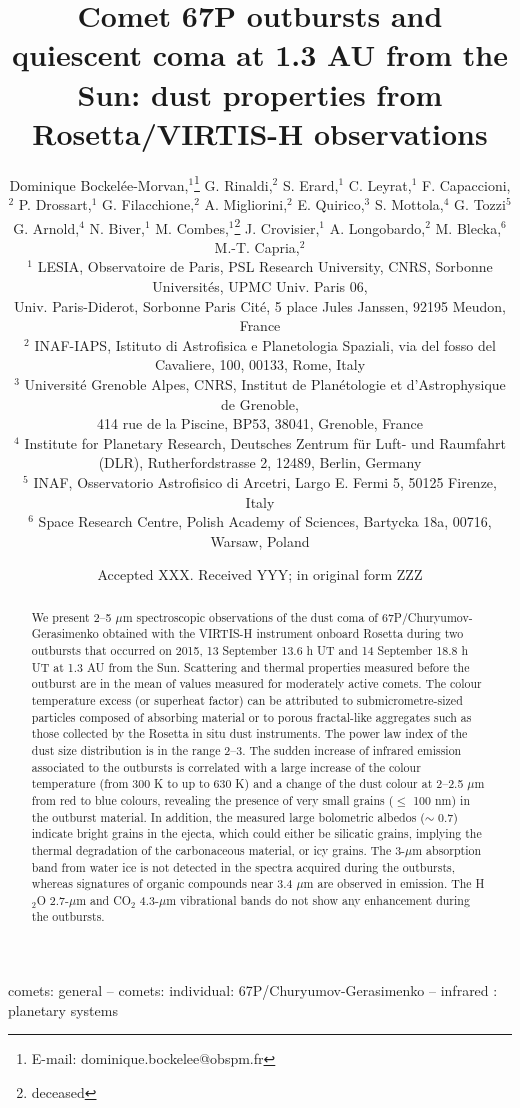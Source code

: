\documentclass[a4paper,fleqn,usenatbib]{mnras}
\title[67P dust properties]{Comet 67P outbursts and quiescent coma at 1.3 AU from the Sun: dust properties from Rosetta/VIRTIS-H observations}
\author[D. Bockel\'ee-Morvan et al.]{Dominique Bockel\'ee-Morvan,$^{1}$\thanks{E-mail: dominique.bockelee@obspm.fr}
G. Rinaldi,$^{2}$
S. Erard,$^{1}$
C. Leyrat,$^{1}$
F. Capaccioni,$^{2}$
\newauthor
P. Drossart,$^{1}$ G. Filacchione,$^{2}$  A. Migliorini,$^{2}$ E.
Quirico,$^{3}$ S. Mottola,$^{4}$
 G. Tozzi$^{5}$
\newauthor
G. Arnold,$^{4}$ N. Biver,$^{1}$ M. Combes,$^{1}$\thanks{deceased}
J. Crovisier,$^{1}$
 A. Longobardo,$^{2}$ M. Blecka,$^{6}$  
 \newauthor
 M.-T. Capria,$^{2}$
\\
$^{1}$ LESIA, Observatoire de Paris, PSL Research University, CNRS, Sorbonne Universit\'es, UPMC Univ. Paris 06, \\
Univ. Paris-Diderot, Sorbonne Paris Cit\'e, 5 place Jules Janssen, 92195 Meudon, France\\
$^{2}$ INAF-IAPS, Istituto di Astrofisica e Planetologia Spaziali, via del fosso del Cavaliere, 100, 00133, Rome, Italy \\
$^{3}$ Universit\'e Grenoble Alpes, CNRS, Institut de Plan\'etologie et d'Astrophysique de Grenoble, \\ 414 rue de la Piscine, BP53, 38041, Grenoble, France  \\
$^{4}$ Institute for Planetary Research, Deutsches Zentrum f\"{u}r Luft- und Raumfahrt (DLR), Rutherfordstrasse 2, 12489, Berlin, Germany \\
$^{5}$ INAF, Osservatorio Astrofisico di Arcetri,  Largo E. Fermi
5, 50125 Firenze, Italy\\ $^{6}$ Space Research Centre, Polish
Academy of Sciences, Bartycka 18a, 00716, 
Warsaw, Poland
}
\date{Accepted XXX. Received YYY; in original form ZZZ}
\begin{document}
\label{firstpage}
\pagerange{\pageref{firstpage}--\pageref{lastpage}}
\maketitle

\begin{abstract}
    We present 2--5 $\mu$m spectroscopic observations of the dust coma of 67P/Churyumov-Gerasimenko
    obtained with the VIRTIS-H instrument onboard Rosetta during two
outbursts that occurred on 2015, 13 September 13.6 h UT and 14
September 18.8 h UT at 1.3 AU from the Sun.  Scattering and thermal
properties measured before the outburst are in the mean of values
measured for  moderately active comets. The colour
temperature excess (or superheat factor) can be attributed to submicrometre-sized  particles composed of absorbing material or to porous fractal-like
aggregates such as those collected by the Rosetta in situ dust
instruments. The power law index of the dust size distribution is
in the range 2--3.  The sudden increase of infrared emission
associated to the outbursts is correlated with a large increase of
the colour temperature (from 300 K to up to 630 K) and a change of
the dust colour at 2--2.5 $\mu$m from red to blue colours,
revealing the presence of very small grains ($\leq$ 100 nm) in the
outburst material. In addition, the measured large bolometric
albedos ($\sim$ 0.7) indicate bright grains in the ejecta, which
could either be silicatic grains, implying the thermal degradation
of the carbonaceous material, or icy grains. The 3-$\mu$m
absorption band from water ice is not detected in the spectra
acquired during the outbursts, whereas signatures of organic
compounds  near 3.4 $\mu$m are observed in emission. The H$_2$O
2.7-$\mu$m and CO$_2$ 4.3-$\mu$m vibrational bands do not show any
enhancement during the outbursts.


\end{abstract}


\begin{keywords}
comets: general -- comets: individual: 67P/Churyumov-Gerasimenko -- infrared : planetary systems
\end{keywords}


\end{document}
